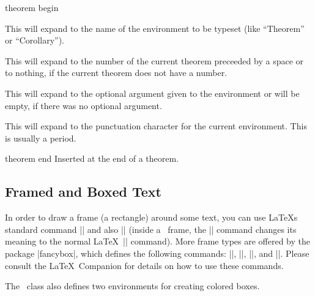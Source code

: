 \begin{element}{theorem begin}
\begin{itemize}
    \iteminsert{\inserttheoremname}
    This will expand to the name of the environment to be typeset (like ``Theorem'' or ``Corollary'').

    \iteminsert{\inserttheoremnumber}
    This will expand to the number of the current theorem preceeded by a space or to nothing, if the current theorem does not have a number.

    \iteminsert{\inserttheoremaddition}
    This will expand to the optional argument given to the environment or will be empty, if there was no optional argument.

    \iteminsert{\inserttheorempunctuation}
    This will expand to the punctuation character for the current environment. This is usually a period.
  \end{itemize}
\end{element}

\begin{element}{theorem end}\yes\no\no
  Inserted at the end of a theorem.
\end{element}


\subsection{Framed and Boxed Text}

In order to draw a frame (a rectangle) around some text, you can use \LaTeX s standard command |\fbox| and also |\frame| (inside a \beamer\ frame, the |\frame| command changes its meaning to the normal \LaTeX\ |\frame| command). More frame types are offered by the package |fancybox|, which defines the following commands: |\shadowbox|, |\doublebox|, |\ovalbox|, and |\Ovalbox|. Please consult the \LaTeX\ Companion for details on how to use these commands.

The \beamer\ class also defines two environments for creating colored boxes.

